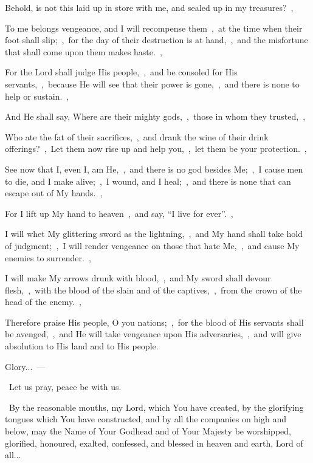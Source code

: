 \documentclass[12pt,twoside,a5paper]{article}
\begin{document}
\begin{halfparskip}
  Behold, is not this laid up in store with me, and sealed up in my treasures?~\sep

  To me belongs vengeance, and I will recompense them~\sep\ at the time when their foot shall slip;~\sep\ for the day of their destruction is at hand,~\sep\ and the misfortune that shall come upon them makes haste.~\sep

  For the Lord shall judge His people,~\sep\ and be consoled for His servants,~\sep\ because He will see that their power is gone,~\sep\ and there is none to help or sustain.~\sep

  And He shall say, Where are their mighty gods,~\sep\ those in whom they trusted,~\sep

  Who ate the fat of their sacrifices,~\sep\ and drank the wine of their drink offerings?~\sep\ Let them now rise up and help you,~\sep\ let them be your protection.~\sep

  See now that I, even I, am He,~\sep\ and there is no god besides Me;~\sep\ I cause men to die, and I make alive;~\sep\ I wound, and I heal;~\sep\ and there is none that can escape out of My hands.~\sep

  For I lift up My hand to heaven~\sep\ and say, ``I live for ever''.~\sep

  I will whet My glittering sword as the lightning,~\sep\ and My hand shall take hold of judgment;~\sep\ I will render vengeance on those that hate Me,~\sep\ and cause My enemies to surrender.~\sep

  I will make My arrows drunk with blood,~\sep\ and My sword shall devour flesh,~\sep\ with the blood of the slain and of the captives,~\sep\ from the crown of the head of the enemy.~\sep

  Therefore praise His people, O you nations;~\sep\ for the blood of His servants shall be avenged,~\sep\ and He will take vengeance upon His adversaries,~\sep\ and will give absolution to His land and to His people.
\end{halfparskip}


\begin{halfparskip}
  Glory...~--- 
\end{halfparskip}

\dd~Let us pray, peace be with us.

\cc~By the reasonable mouths, my Lord, which You have created, by the glorifying tongues which You have constructed, and by all the companies on high and below, may the Name of Your Godhead and of Your Majesty be worshipped, glorified, honoured, exalted, confessed, and blessed in heaven and earth, Lord of all...
\end{document}
